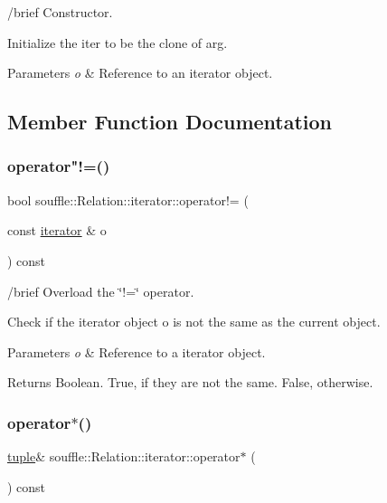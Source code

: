 /brief Constructor.

Initialize the iter to be the clone of arg. 
\begin{DoxyParams}{Parameters}
{\em o} & Reference to an iterator object. \\
\hline
\end{DoxyParams}


\subsection{Member Function Documentation}
\mbox{\label{classsouffle_1_1_relation_1_1iterator_a9605a06c5f3f18025f047ff0c6fcf7a6}} 
\subsubsection{\texorpdfstring{operator"!=()}{operator!=()}}
{\footnotesize\ttfamily bool souffle\+::\+Relation\+::iterator\+::operator!= (\begin{DoxyParamCaption}\item[{const \hyperlink{classsouffle_1_1_relation_1_1iterator}{iterator} \&}]{o }\end{DoxyParamCaption}) const\hspace{0.3cm}{\ttfamily [inline]}}

/brief Overload the \char`\"{}!=\char`\"{} operator.

Check if the iterator object o is not the same as the current object. 
\begin{DoxyParams}{Parameters}
{\em o} & Reference to a iterator object. \\
\hline
\end{DoxyParams}
\begin{DoxyReturn}{Returns}
Boolean. True, if they are not the same. False, otherwise. 
\end{DoxyReturn}
\mbox{\label{classsouffle_1_1_relation_1_1iterator_a64d750911dc77046da33505c0bfcc6a6}} 
\subsubsection{\texorpdfstring{operator$\ast$()}{operator*()}}
{\footnotesize\ttfamily \hyperlink{classsouffle_1_1tuple}{tuple}\& souffle\+::\+Relation\+::iterator\+::operator$\ast$ (\begin{DoxyParamCaption}{ }\end{DoxyParamCaption}) const\hspace{0.3cm}{\ttfamily [inline]}}

